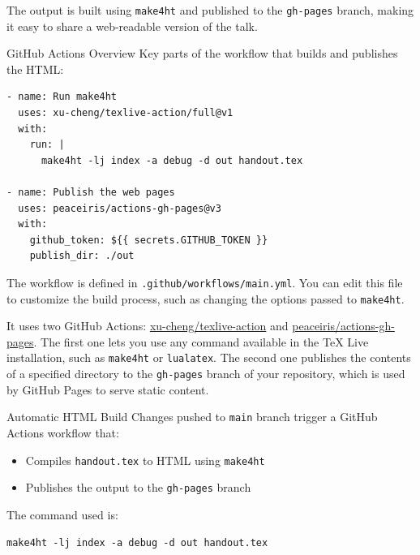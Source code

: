 The output is built using \texttt{make4ht} and published to the \texttt{gh-pages} branch,
making it easy to share a web-readable version of the talk.

\begin{frame}[fragile]{GitHub Actions Overview}
Key parts of the workflow that builds and publishes the HTML:

\begin{verbatim}
- name: Run make4ht
  uses: xu-cheng/texlive-action/full@v1
  with:
    run: |
      make4ht -lj index -a debug -d out handout.tex

- name: Publish the web pages
  uses: peaceiris/actions-gh-pages@v3
  with:
    github_token: ${{ secrets.GITHUB_TOKEN }}
    publish_dir: ./out
\end{verbatim}

\end{frame}


The workflow is defined in \texttt{.github/workflows/main.yml}.
You can edit this file to customize the build process, such as changing the options passed to \texttt{make4ht}.

It uses two GitHub Actions: \href{https://github.com/xu-cheng/texlive-action}{xu-cheng/texlive-action}
and \href{https://github.com/peaceiris/actions-gh-pages}{peaceiris/actions-gh-pages}.
The first one lets you use any command available in the TeX Live installation, such as \texttt{make4ht} or \texttt{lualatex}.
The second one publishes the contents of a specified directory to the \texttt{gh-pages} branch of your repository,
which is used by GitHub Pages to serve static content.



\begin{frame}[fragile]{Automatic HTML Build}
Changes pushed to \texttt{main} branch trigger a GitHub Actions workflow that:

\begin{itemize}
  \item Compiles \texttt{handout.tex} to HTML using \texttt{make4ht}
  \item Publishes the output to the \texttt{gh-pages} branch
\end{itemize}

The command used is:

\begin{verbatim}
make4ht -lj index -a debug -d out handout.tex
\end{verbatim}
\end{frame}


